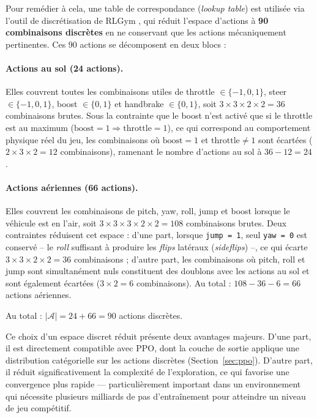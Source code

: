 Pour remédier à cela, une table de correspondance (\textit{lookup table}) est utilisée via l'outil de discrétisation de RLGym \parencite{RLGymRlgym2026}, qui réduit l'espace d'actions à \textbf{90 combinaisons discrètes} en ne conservant que les actions mécaniquement pertinentes. Ces 90 actions se décomposent en deux blocs : 

\paragraph{Actions au sol (24 actions).} 
Elles couvrent toutes les combinaisons utiles de throttle $\in \{-1, 0, 1\}$, steer $\in \{-1, 0, 1\}$, boost $\in \{0, 1\}$ et handbrake $\in \{0, 1\}$, soit $3 \times 3 \times 2 \times 2 = 36$ combinaisons brutes. Sous la contrainte que le boost n'est activé que si le throttle est au maximum ($\text{boost} = 1 \Rightarrow \text{throttle} = 1$), ce qui correspond au comportement physique réel du jeu, les combinaisons où $\text{boost} = 1$ et 
$\text{throttle} \neq 1$ sont écartées ($2 \times 3 \times 2 = 12$ combinaisons), ramenant le nombre d'actions au sol à $36 - 12 = 24$.

\paragraph{Actions aériennes (66 actions).} 
Elles couvrent les combinaisons de pitch, yaw, roll, jump et boost lorsque le véhicule est en l'air, soit $3 \times 3 \times 3 \times 2 \times 2 = 108$ combinaisons brutes. Deux contraintes réduisent cet espace : d'une part, lorsque \texttt{jump = 1}, seul \texttt{yaw = 0} est conservé 
-- le \textit{roll} suffisant à produire les \textit{flips} latéraux (\textit{sideflips}) --, ce qui écarte $3 \times 3 \times 2 \times 2 = 36$ combinaisons ; d'autre part, les combinaisons où pitch, roll et jump sont simultanément nuls constituent des doublons avec les actions au sol et 
sont également écartées ($3 \times 2 = 6$ combinaisons). Au total : 
$108 - 36 - 6 = 66$ actions aériennes.

Au total : $|\mathcal{A}| = 24 + 66 = 90$ actions discrètes.

Ce choix d'un espace discret réduit présente deux avantages majeurs. D'une part, il est directement compatible avec PPO, dont la couche de sortie applique une distribution catégorielle sur les actions discrètes (Section~\ref{sec:ppo}). D'autre part, il réduit significativement la complexité de l'exploration, ce qui favorise une convergence plus rapide — particulièrement important dans un environnement qui nécessite plusieurs milliards de pas d'entraînement pour atteindre un niveau de jeu compétitif.


